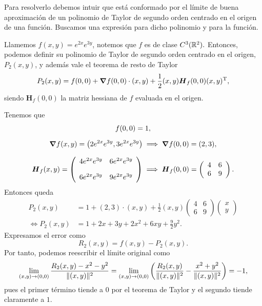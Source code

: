 
\begin{solution}
    Para resolverlo debemos intuir que está conformado por el límite de buena aproximación de un polinomio de Taylor de segundo orden centrado en el origen de una función. Buscamos una expresión para dicho polinomio y para la función.

    Llamemos $f(x,y) = e^{2x}e^{3y}$, notemos que $f$ es de clase $C^3(\mathbb{R}^2).$  Entonces, podemos definir su polinomio de Taylor de segundo orden centrado en el origen, $ P_2(x,y)$, y adem\'as vale el teorema de resto de Taylor
    \[
        P_2(x,y) = f(0,0) + \grad f(0,0)\cdot(x,y) + \frac{1}{2}(x,y)\boldsymbol{H}_f(0,0)(x,y)^\mathrm{T},
    \]
    siendo $\boldsymbol{H}_f(0,0)$ la matriz hessiana de $f$ evaluada en el origen.

    Tenemos que
    \begin{gather*}
        f(0,0) = 1,\\[.2cm]
        \grad f(x,y) = \left(2e^{2x}e^{3y}, 3e^{2x}e^{3y}\right) \implies \grad f(0,0) = (2,3),\\[.25cm]
        \boldsymbol{H}_f(x,y) = \left(\begin{array}{cc}
                4e^{2x}e^{3y} & 6e^{2x}e^{3y} \\[10pt]
                6e^{2x}e^{3y} & 9e^{2x}e^{3y}
            \end{array}\right) \implies \boldsymbol{H}_f(0,0) = \left(\begin{array}{cc}
                4 & 6 \\
                6 & 9
            \end{array}\right).
    \end{gather*}
    Entonces queda
    \[
        \begin{aligned}
            P_2(x,y)      & = 1+(2,3)\cdot(x,y)+\frac{1}{2}(x,y)
            \left(\begin{array}{cc}  
                    4 & 6 \\
                    6 & 9
                \end{array}\right)
            \left(\begin{array}{cc}
                          x \\
                          y
                      \end{array}\right)                                                     \\[4pt]
            \iff P_2(x,y) & = 1 + 2x + 3y + 2x^2 + 6xy + \frac{9}{2}y^2.
        \end{aligned}
    \]
    Expresamos el error como
    \[
        R_2(x,y) = f(x,y) - P_2(x,y).
    \]
    Por tanto, podemos reescribir el límite original como
    \[\\[2pt]
        \lim_{(x,y) \to (0,0)} \frac{R_2(x,y) - x^2 - y^2}{\|(x,y)\|^2} =
        \lim_{(x,y) \to (0,0)} \left( \frac{R_2(x,y)}{\|(x,y)\|^2} - \frac{x^2+y^2}{\|(x,y)\|^2} \right) = -1,
    \]
    pues el primer término tiende a 0 por el teorema de Taylor  y el segundo  tiende claramente a $1.$
\end{solution}

